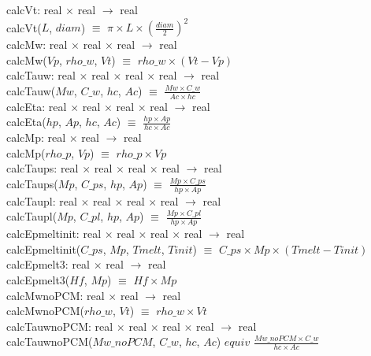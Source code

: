 \documentclass[12pt]{article}
\begin{document}
calcVt: real $\times$ real $\rightarrow$ real \\
calcVt($L$, $diam$) $\equiv$ $\pi \times L \times (\frac{diam}{2}) ^ 2$ \\
\newline
calcMw: real $\times$ real $\times$ real $\rightarrow$ real \\
calcMw($Vp$, $rho\_w$, $Vt$) $\equiv$ $rho\_w \times (Vt - Vp)$ \\
\newline
calcTauw: real $\times$ real $\times$ real $\times$ real $\rightarrow$ real \\
calcTauw($Mw$, $C\_w$, $hc$, $Ac$) $\equiv$ $\frac{Mw \times C\_w}{Ac \times hc}$ \\
\newline
calcEta: real $\times$ real $\times$ real $\times$ real $\rightarrow$ real \\
calcEta($hp$, $Ap$, $hc$, $Ac$) $\equiv$ $\frac{hp \times Ap}{hc \times Ac}$ \\
\newline
calcMp: real $\times$ real $\rightarrow$ real \\
calcMp($rho\_p$, $Vp$) $\equiv$ $rho\_p \times Vp$ \\
\newline
calcTaups: real $\times$ real $\times$ real $\times$ real $\rightarrow$ real \\
calcTaups($Mp$, $C\_ps$, $hp$, $Ap$) $\equiv$ $\frac{Mp \times C\_ps}{hp \times Ap}$ \\
\newline
calcTaupl: real $\times$ real $\times$ real $\times$ real $\rightarrow$ real \\
calcTaupl($Mp$, $C\_pl$, $hp$, $Ap$) $\equiv$ $\frac{Mp \times C\_pl}{hp \times Ap}$ \\
\newline
calcEpmeltinit: real $\times$ real $\times$ real $\times$ real $\rightarrow$ real \\
calcEpmeltinit($C\_ps$, $Mp$, $Tmelt$, $Tinit$) $\equiv$ $C\_ps \times Mp \times (Tmelt - Tinit)$ \\
\newline
calcEpmelt3: real $\times$ real $\rightarrow$ real \\
calcEpmelt3($Hf$, $Mp$) $\equiv$ $Hf \times Mp$ \\
\newline
calcMwnoPCM: real $\times$ real $\rightarrow$ real \\
calcMwnoPCM($rho\_w$, $Vt$) $\equiv$ $rho\_w \times Vt$ \\
\newline
calcTauwnoPCM: real $\times$ real $\times$ real $\times$ real $\rightarrow$ real \\
calcTauwnoPCM($Mw\_noPCM$, $C\_w$, $hc$, $Ac$) $equiv$ $\frac{Mw\_noPCM \times C\_w}{hc \times Ac}$ \\
\end{document}
